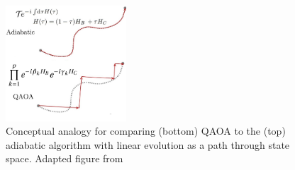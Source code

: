 \begin{figure}[H]
	\centering
	\includegraphics[width=0.4\textwidth]{figures/concept_relation_qaoa_and_qaa_edit.jpg}
	\caption{Conceptual analogy for comparing (bottom) QAOA
		to the (top) adiabatic algorithm with linear evolution as a path through state space. Adapted figure from \cite{VBB17}}
	\label{fig:QA-QAOA}
\end{figure}


